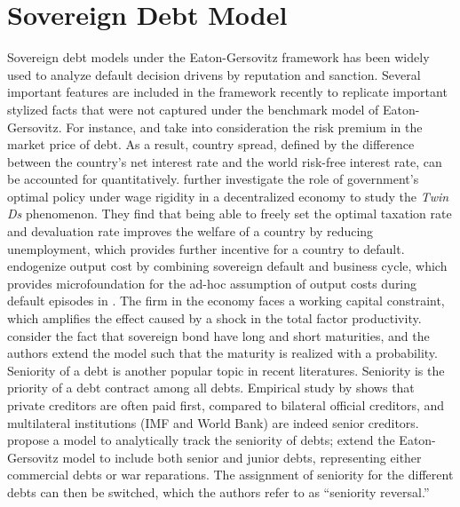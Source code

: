 \section{Sovereign Debt Model}
Sovereign debt models under the Eaton-Gersovitz framework has been widely used to analyze default decision drivens by reputation and sanction\citep*{Eaton-Gersovitz-81}.
Several important features are included in the framework recently to replicate important stylized facts that were not captured under the benchmark model of Eaton-Gersovitz.
For instance,
\citet{Aguiar-Gopinath-06} and \citet{Arellano-08} take into consideration the risk premium in the market price of debt. As a result, country spread, defined by the difference between the country's net interest rate and the world risk-free interest rate, can be accounted for quantitatively.
\citet{Na-18} further investigate the role of government's optimal policy under wage rigidity in a decentralized economy to study the \emph{Twin Ds} phenomenon. They find that being able to freely set the optimal taxation rate and devaluation rate improves the welfare of a country by reducing unemployment, which provides further incentive for a country to default.
\citet*{Mendoza-Yue-12} endogenize output cost by combining sovereign default and business cycle, which provides microfoundation for the ad-hoc assumption of output costs during default episodes in \citet{Arellano-08}. The firm in the economy faces a working capital constraint, which amplifies the effect caused by a shock in the total factor productivity.
\citet*{Chatterjee-12} consider the fact that sovereign bond have long and short maturities, and the authors extend the model such that the maturity is realized with a probability.
Seniority of a debt is another popular topic in recent literatures. Seniority is the priority of a debt contract among all debts. Empirical study by \citet*{Schlegl-Trebesch-Wright-19} shows that private creditors are often paid first, compared to bilateral official creditors, and multilateral institutions (IMF and World Bank) are indeed senior creditors. \citet*{Chatterjee-15-seniority} propose a model to analytically track the seniority of debts; \citet*{Ho-Ritschl-23} extend the Eaton-Gersovitz model to include both senior and junior debts, representing either commercial debts or war reparations. The assignment of seniority for the different debts can then be switched, which the authors refer to as ``seniority reversal.''

